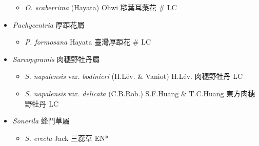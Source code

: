 \begin{itemize}
  \begin{itemize}
        \item[] \textit{O. scaberrima} (Hayata) Ohwi  糙葉耳藥花  \# LC
  \end{itemize}
 \item[] \textit{Pachycentria} 厚距花屬
                                
  \begin{itemize}
        \item[] \textit{P. formosana} Hayata  臺灣厚距花  \# LC
  \end{itemize}
 \item[] \textit{Sarcopyramis} 肉穗野牡丹屬
                                
  \begin{itemize}
        \item[] \textit{S. napalensis} var. \textit{bodinieri} (H.Lév. \& Vaniot) H.Lév.  肉穗野牡丹   LC
        \item[] \textit{S. napalensis} var. \textit{delicata} (C.B.Rob.) S.F.Huang \& T.C.Huang  東方肉穗野牡丹   LC
  \end{itemize}
 \item[] \textit{Sonerila} 蜂鬥草屬
                                
  \begin{itemize}
        \item[] \textit{S. erecta} Jack  三蕊草   EN*
  \end{itemize}
  \end{itemize}
